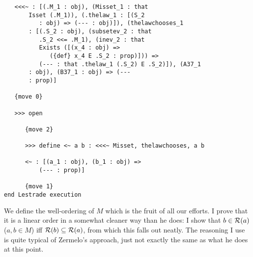 \documentclass[12pt]{article}
\begin{document}
\begin{verbatim}
   <<<~ : [(.M_1 : obj), (Misset_1 : that 
       Isset (.M_1)), (.thelaw_1 : [(S_2 
          : obj) => (--- : obj)]), (thelawchooses_1 
       : [(.S_2 : obj), (subsetev_2 : that 
          .S_2 <<= .M_1), (inev_2 : that 
          Exists ([(x_4 : obj) => 
             ({def} x_4 E .S_2 : prop)])) => 
          (--- : that .thelaw_1 (.S_2) E .S_2)]), (A37_1 
       : obj), (B37_1 : obj) => (--- 
       : prop)]

   {move 0}

   >>> open

      {move 2}

      >>> define <~ a b : <<<~ Misset, thelawchooses, a b

      <~ : [(a_1 : obj), (b_1 : obj) => 
          (--- : prop)]

      {move 1}
end Lestrade execution
\end{verbatim}

We define the well-ordering of $M$ which is the fruit of all our efforts.  I prove that it is a linear order in a somewhat cleaner way than he does:
I show that $b \in {\cal R}(a)$ ($a,b \in M$) iff ${\cal R}(b) \subseteq {\cal R}(a)$, from which this falls out neatly.  The reasoning I use is quite typical of Zermelo's approach, just not exactly the same as what he does at this point.
\end{document}

